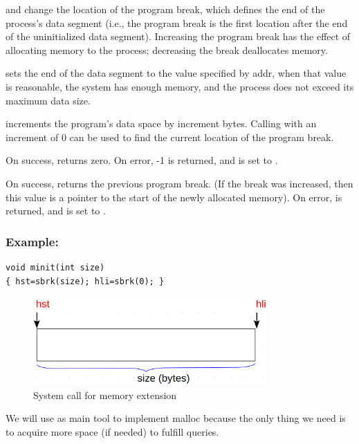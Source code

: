  and  change the location of the program break, which defines the end of the process's data segment (i.e., the program break is the first location after the end of the uninitialized data segment). Increasing the program break has the effect of allocating memory to the process; decreasing the break deallocates memory.

 sets the end of the data segment to the value specified by addr, when that value is reasonable, the system has enough memory, and the process does not exceed its maximum data size.

 increments the program's data space by increment bytes. Calling  with an increment of 0 can be used to find the current location of the program break.

On success,  returns zero. On error, -1 is returned, and  is set to .

On success,  returns the previous program break. (If the break was increased, then this value is a pointer to the start of the newly allocated memory). On error,  is returned, and  is set to .\\

\subsubsection{Example:}

\begin{lstlisting}[style=cstyle]
void minit(int size) 
{ hst=sbrk(size); hli=sbrk(0); }
\end{lstlisting}

\begin{figure}[htbp]
    \begin{center}
        \includegraphics[width=0.8\textwidth]{figures/sbrk}
    \caption{System call for memory extension}
    \label{}
    \end{center}
\end{figure}

We will use  as main tool to implement malloc because the only thing we need is to acquire more space (if needed) to fulfill queries.

